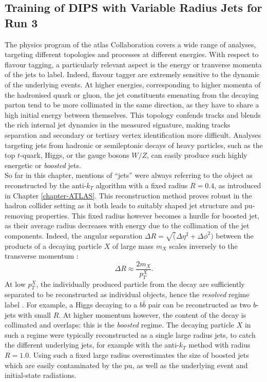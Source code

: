 \subsection{Training of DIPS with Variable Radius Jets for Run 3}\label{chapter:dipsVRtrain}
The physics program of the \gls{atlas} Collaboration covers a wide range of analyses, targeting different topologies and processes at different energies. With respect to flavour tagging, a particularly relevant aspect is the energy or tranverse momenta of the jets to label. Indeed, flavour tagger are extremely sensitive to the dynamic of the underlying events. At higher energies, corresponding to higher momenta of the hadronised quark or gluon, the jet constituents emenating from the decaying parton tend to be more collimated in the same direction, as they have to share a high initial energy between themselves. This topology confends tracks and blends the rich internal jet dynamics in the measured signature, making tracks separation and secondary or tertiary vertex identification more difficult. Analyses targeting jets from hadronic or semileptonic decays of heavy particles, such as the top $t$-quark, Higgs, or the gauge bosons $W/Z$, can easily produce such highly energetic or \textit{boosted} jets.  \\

So far in this chapter, mentions of ``jets'' were always referring to the object as reconstructed by the anti-$k_T$ algorithm with a fixed radius $R = 0.4$, as introduced in Chapter \ref{chapter-ATLAS}. This reconstruction method proves robust in the hadron collider setting as it both leads to suitably shaped jet structure and \gls{pu}-removing properties. This fixed radius however becomes a hurdle for boosted jet, as their average radius decreases with energy due to the collimation of the jet components. Indeed, the angular separation $\Delta R = \sqrt(\Delta\eta^2 + \Delta \phi^2)$ between the products of a decaying particle $X$ of large mass $m_X$ scales inversely to the transverse momentum \cite{ATLAS:largeRjet}: 
\begin{equation}\label{eq:sizeJet}
  \Delta R \approx \frac{2 m_X}{p_T^X}.
\end{equation}
At low $p_T^X$, the individually produced particle from the decay are sufficiently separated to be reconstructed as individual objects, hence the \textit{resolved} regime label \cite{ATLAS:2016hcf}. For example, a Higgs decaying to a $b\bar{b}$ pair can be reconstructed as two $b$-jets with small $R$. At higher momentum however, the content of the decay is collimated and overlaps: this is the \textit{boosted} regime. The decaying particle $X$ in such a regime were typically reconstructed as a single large radius jets, to catch the different underlying jets, for example with the anti-$k_T$ method with radius $R = 1.0$. Using such a fixed large radius overestimates the size of boosted jets which are easily contaminated by the \gls{pu}, as well as the underlying event and initial-state radiations.  \\

